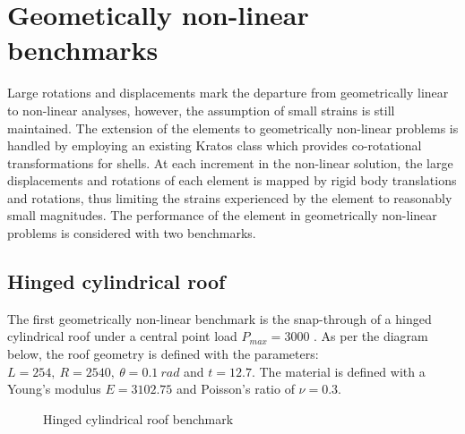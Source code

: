 \section{Geometically non-linear benchmarks}

Large rotations and displacements mark the departure from geometrically linear to non-linear analyses, however, the assumption of small strains is still maintained. The extension of the elements to geometrically non-linear problems is handled by employing an existing Kratos class which provides co-rotational transformations for shells. At each increment in the non-linear solution, the large displacements and rotations of each element is mapped by rigid body translations and rotations, thus limiting the strains experienced by the element to reasonably small magnitudes. The performance of the element in geometrically non-linear problems is considered with two benchmarks.

\subsection{Hinged cylindrical roof}

The first geometrically non-linear benchmark is the snap-through of a hinged cylindrical roof under a central point load $P_{max} = 3000$ \cite{Sze2004}. As per the diagram below, the roof geometry is defined with the parameters: $L = 254,\ R = 2540,\ \theta=0.1\ rad$ and $t = 12.7$. The material is defined with a Young's modulus $E = 3102.75$ and Poisson's ratio of $\nu = 0.3$.

 
\begin{figure}[H]
	\caption{\label{ref_label_overall}Hinged cylindrical roof benchmark}
\end{figure}

